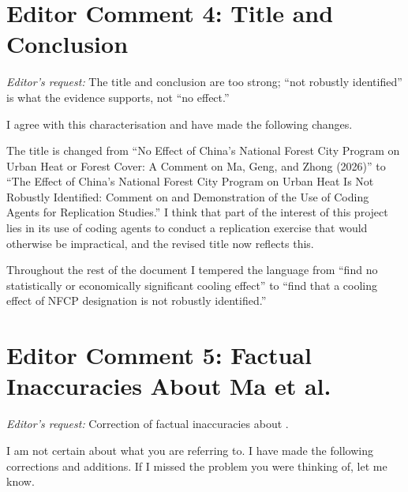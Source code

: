 \documentclass[12pt]{article}
\begin{document}
\section*{Editor Comment 4: Title and Conclusion}

\noindent\textit{Editor's request:} The title and conclusion are too
strong; ``not robustly identified'' is what the evidence supports, not
``no effect.''

\bigskip\noindent
I agree with this characterisation and have made the following changes.

The title is changed from ``No Effect of China's National Forest
City Program on Urban Heat or Forest Cover: A Comment on Ma, Geng, and
Zhong (2026)'' to ``The Effect of China's National Forest City Program on
Urban Heat Is Not Robustly Identified: Comment on \citet{Ma2026} and
Demonstration of the Use of Coding Agents for Replication Studies.''
I think that part of the interest of this project lies in its use of coding
agents to conduct a replication exercise that would otherwise be
impractical, and the revised title now reflects this.

Throughout the rest of the document I tempered the language from ``find no statistically or economically significant cooling effect'' to ``find that a cooling effect of NFCP designation is not robustly identified.''


\section*{Editor Comment 5: Factual Inaccuracies About Ma et al.}

\noindent\textit{Editor's request:} Correction of factual inaccuracies about \citet{Ma2026}.

\bigskip\noindent
I am not certain about what you are referring to. I have made the following corrections and additions. If I missed the problem you were thinking of, let me know.
\end{document}
